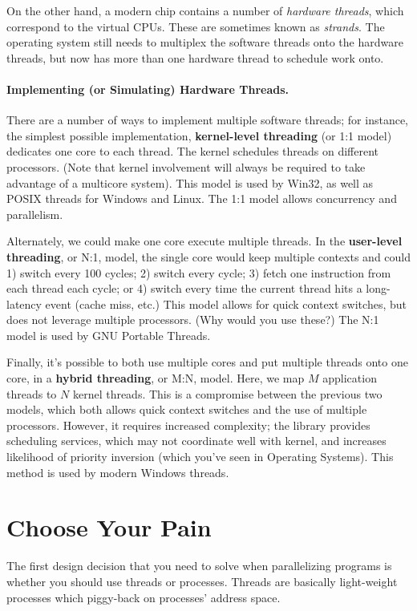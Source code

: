 \documentclass[a4paper]{report}
\begin{document}
On the other hand, a modern chip contains a number of \emph{hardware
threads}, which correspond to the virtual CPUs. These are sometimes
known as \emph{strands}. The operating system still needs to 
multiplex the software threads onto the hardware threads, but now has
more than one hardware thread to schedule work onto.



\paragraph{Implementing (or Simulating) Hardware Threads.} 
There are a number of ways to implement multiple software threads; for
instance, the simplest possible implementation, {\bf kernel-level
threading} (or 1:1 model) dedicates one core to each thread. The kernel schedules threads
on different processors. (Note that kernel involvement will always be required to
take advantage of a multicore system). This model is used by Win32, as well as
POSIX threads for Windows and Linux. The 1:1 model allows concurrency and parallelism.

Alternately, we could make one core execute multiple threads. In the
{\bf user-level threading}, or N:1, model, the single core would keep
multiple contexts and could 1) switch every 100 cycles; 2) switch
every cycle; 3) fetch one instruction from each thread each cycle; or
4) switch every time the current thread hits a long-latency event
(cache miss, etc.) This model allows for quick context switches, but
does not leverage multiple processors. (Why would you use these?) The N:1 model is used by
GNU Portable Threads.

Finally, it's possible to both use multiple cores and put multiple
threads onto one core, in a {\bf hybrid threading}, or M:N, model. Here, we map $M$ application threads to $N$ kernel threads. This
is a compromise between the previous two models, which both allows
quick context switches and the use of multiple processors. However, it
requires increased complexity; the library provides scheduling
services, which may not coordinate well with kernel, and increases
likelihood of priority inversion (which you've seen in Operating
Systems).  This method is used by modern Windows threads.


\section*{Choose Your Pain}
The first design decision that you need to solve when parallelizing programs
is whether you should use threads or processes. Threads are basically light-weight processes which piggy-back on
          processes' address space.
\end{document}
